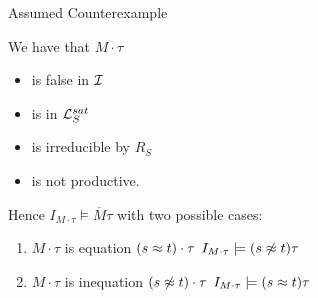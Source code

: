 \documentclass[%
handout,
]{beamer}
\begin{document}
\begin{frame}[allowframebreaks]{Assumed Counterexample}
\begin{itemize}
        \end{itemize}


    \framebreak

        We have that $M\cdot\tau$
    \begin{itemize}
        \item is false in $\mathcal{I}$
        \item is in $\mathcal{L}_S^{sat}$
        \item is irreducible by $R_S$
        \item is not productive.
    \end{itemize}
    \vspace{1em}

    Hence $I_{M\cdot\tau}\models\overline{M}\tau$
    with two possible cases:

    \begin{enumerate}
        \item $M\cdot\tau$ is equation $(s\approx t)\cdot\tau$  \hfill $I_{M\cdot\tau}\models (s\not\approx t)\tau$
        \item $M\cdot\tau$ is inequation $(s\not\approx t)\cdot\tau$ \hfill $I_{M\cdot\tau}\models (s\approx t)\tau$
    \end{enumerate}

\framebreak


\end{frame}
\end{document}
